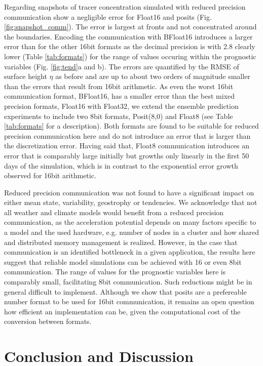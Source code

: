 \documentclass[draft]{agujournal2019}
\begin{document}
Regarding snapshots of tracer concentration simulated with reduced precision communication show a negligible error for Float16 and posits (Fig. \ref{fig:snapshot_comm}). The error is largest at fronts and not concentrated around the boundaries. Encoding the communication with BFloat16 introduces a larger error than for the other 16bit formats as the decimal precision is with 2.8 clearly lower (Table \ref{tab:formats}) for the range of values occuring within the prognostic variables (Fig. \ref{fig:tend}a and b). The errors are quantified by the RMSE of surface height $\eta$ as before and are up to about two orders of magnitude smaller than the errors that result from 16bit arithmetic. As even the worst 16bit communication format, BFloat16, has a smaller error than the best mixed precision formats, Float16 with Float32, we extend the ensemble prediction experiments to include two 8bit formats, Posit(8,0) and Float8 (see Table \ref{tab:formats} for a description). Both formats are found to be suitable for reduced precision communication here and do not introduce an error that is larger than the discretization error. Having said that, Float8 communication introduces an error that is comparably large initially but growths only linearly in the first 50 days of the simulation, which is in contrast to the exponential error growth observed for 16bit arithmetic.

Reduced precision communication was not found to have a significant impact on either mean state, variability, geostrophy or tendencies. We acknowledge that not all weather and climate models would benefit from a reduced precision communication, as the acceleration potential depends on many factors specific to a model and the used hardware, e.g. number of nodes in a cluster and how shared and distributed memory management is realized. However, in the case that communication is an identified bottleneck in a given application, the results here suggest that reliable model simulations can be achieved with 16 or even 8bit communication. The range of values for the prognostic variables here is comparably small, facilitating 8bit communication. Such reductions might be in general difficult to implement. Although we show that posits are a prefereable number format to be used for 16bit communication, it remains an open question how efficient an implementation can be, given the computational cost of the conversion between formats.

\section{Conclusion and Discussion}
\label{sec:discuss}
\end{document}
